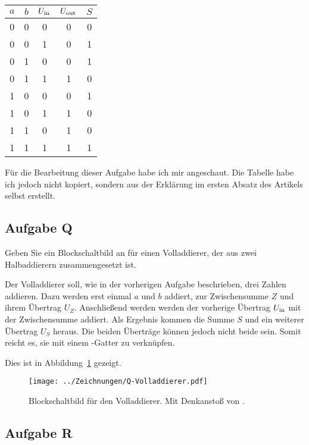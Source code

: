 \begin{tabular}{ccc|cc}
	$a$ & $b$ & $U_\text{in}$ & $U_\text{out}$ & $S$ \\
	\hline
	0 & 0 & 0 & 0 & 0 \\
	0 & 0 & 1 & 0 & 1 \\
	0 & 1 & 0 & 0 & 1 \\
	0 & 1 & 1 & 1 & 0 \\
	1 & 0 & 0 & 0 & 1 \\
	1 & 0 & 1 & 1 & 0 \\
	1 & 1 & 0 & 1 & 0 \\
	1 & 1 & 1 & 1 & 1 \\
\end{tabular}

\begin{small}
	Für die Bearbeitung dieser Aufgabe habe ich mir
	\cite{wikipedia/Volladdierer} angeschaut. Die Tabelle habe ich jedoch nicht
	kopiert, sondern aus der Erklärung im ersten Absatz des Artikels selbst
	erstellt.
\end{small}

\FloatBarrier
\subsection{Aufgabe Q}

\begin{problem}
	Geben Sie ein Blockschaltbild an für einen Volladdierer, der aus zwei
	Halbaddierern zusammengesetzt ist.
\end{problem}

Der Volladdierer soll, wie in der vorherigen Aufgabe beschrieben, drei Zahlen
addieren. Dazu werden erst einmal $a$ und $b$ addiert, zur Zwischensumme $Z$
und ihrem Übertrag $U_Z$. Anschließend werden werden der vorherige Übertrag
$U_\text{in}$ mit der Zwischensumme addiert. Als Ergebnis kommen die Summe $S$ und ein
weiterer Übertrag $U_S$ heraus. Die beiden Überträge können jedoch nicht beide
\thigh{} sein. Somit reicht es, sie mit einem \tor-Gatter zu verknüpfen.

Dies ist in Abbildung~\ref{fig:Q-Volladdierer} gezeigt.

\begin{figure}[htbp]
	\centering
	\texttt{[image: ../Zeichnungen/Q-Volladdierer.pdf]}
	\caption{%
		Blockschaltbild für den Volladdierer. Mit Denkanstoß von
		\cite{wikipedia/Volladdierer}.
	}
	\label{fig:Q-Volladdierer}
\end{figure}

\FloatBarrier
\subsection{Aufgabe R}

